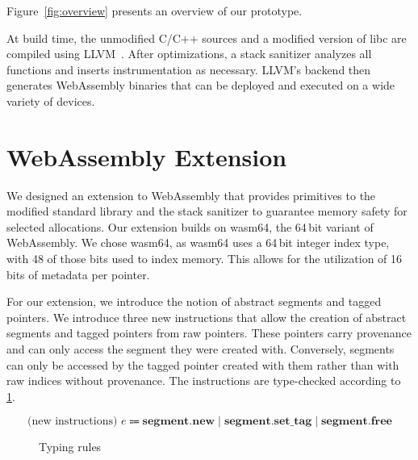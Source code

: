 Figure~\ref{fig:overview} presents an overview of our prototype.

At build time, the unmodified C/C++ sources and a modified version of libc are compiled using LLVM~\cite{lattner2004llvm}.
After optimizations, a stack sanitizer analyzes all functions and inserts instrumentation as necessary.
LLVM's backend then generates WebAssembly binaries that can be deployed and executed on a wide variety of devices.

\section{WebAssembly Extension}
\label{sec:wasm-extension}

We designed an extension to WebAssembly that provides primitives to the modified standard library and the stack sanitizer to guarantee memory safety for selected allocations.
Our extension builds on wasm64, the 64\,bit variant of WebAssembly.
We chose wasm64, as wasm64 uses a 64\,bit integer index type, with 48 of those bits used to index memory.
This allows for the utilization of 16 bits of metadata per pointer.

For our extension, we introduce the notion of abstract segments and tagged pointers.
We introduce three new instructions that allow the creation of abstract segments and tagged pointers from raw pointers.
These pointers carry provenance and can only access the segment they were created with.
Conversely, segments can only be accessed by the tagged pointer created with them rather than with raw indices without provenance.
The instructions are type-checked according to \cref{fig:typing-rules}.

\begin{equation*}
    \text{(new instructions) } e \Coloneqq \textbf{segment.new} \mid \textbf{segment.set\_tag} \mid \textbf{segment.free}
\end{equation*}


\begin{figure}[t]
    \begin{prooftree}
    \end{prooftree}
    \begin{prooftree}
    \end{prooftree}
    \begin{prooftree}
    \end{prooftree}
    \caption{Typing rules}
    \label{fig:typing-rules}
\end{figure}

